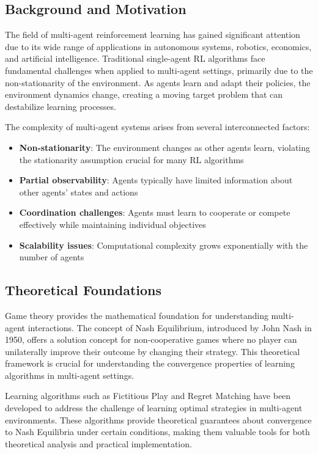 \documentclass[conference]{IEEEtran}
\begin{document}
\subsection{Background and Motivation}

The field of multi-agent reinforcement learning has gained significant attention due to its wide range of applications in autonomous systems, robotics, economics, and artificial intelligence. Traditional single-agent RL algorithms face fundamental challenges when applied to multi-agent settings, primarily due to the non-stationarity of the environment. As agents learn and adapt their policies, the environment dynamics change, creating a moving target problem that can destabilize learning processes.

The complexity of multi-agent systems arises from several interconnected factors:
\begin{itemize}
    \item \textbf{Non-stationarity}: The environment changes as other agents learn, violating the stationarity assumption crucial for many RL algorithms
    \item \textbf{Partial observability}: Agents typically have limited information about other agents' states and actions
    \item \textbf{Coordination challenges}: Agents must learn to cooperate or compete effectively while maintaining individual objectives
    \item \textbf{Scalability issues}: Computational complexity grows exponentially with the number of agents
\end{itemize}

\subsection{Theoretical Foundations}

Game theory provides the mathematical foundation for understanding multi-agent interactions. The concept of Nash Equilibrium, introduced by John Nash in 1950, offers a solution concept for non-cooperative games where no player can unilaterally improve their outcome by changing their strategy. This theoretical framework is crucial for understanding the convergence properties of learning algorithms in multi-agent settings.

Learning algorithms such as Fictitious Play and Regret Matching have been developed to address the challenge of learning optimal strategies in multi-agent environments. These algorithms provide theoretical guarantees about convergence to Nash Equilibria under certain conditions, making them valuable tools for both theoretical analysis and practical implementation.
\end{document}
